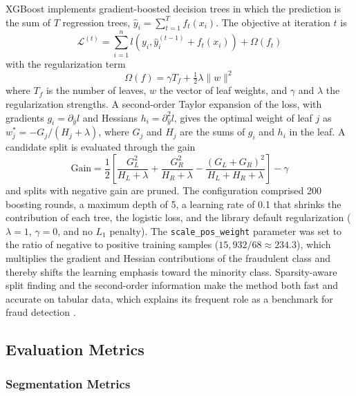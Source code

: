 \documentclass[conference]{IEEEtran}
\begin{document}
XGBoost \cite{chen2016xgboost} implements gradient-boosted decision trees in which the prediction is the sum of $T$ regression trees, $\hat{y}_i=\sum_{t=1}^{T}f_t(x_i)$. The objective at iteration $t$ is
\begin{equation}
    \mathcal{L}^{(t)} = \sum_{i=1}^{n} l(y_i, \hat{y}_i^{(t-1)} + f_t(x_i)) + \Omega(f_t)
\end{equation}
with the regularization term
\begin{equation}
    \Omega(f)=\gamma T_f + \tfrac{1}{2}\lambda\|w\|^2
\end{equation}
where $T_f$ is the number of leaves, $w$ the vector of leaf weights, and $\gamma$ and $\lambda$ the regularization strengths. A second-order Taylor expansion of the loss, with gradients $g_i=\partial_{\hat{y}}l$ and Hessians $h_i=\partial^2_{\hat{y}}l$, gives the optimal weight of leaf $j$ as $w_j^{*}=-G_j/(H_j+\lambda)$, where $G_j$ and $H_j$ are the sums of $g_i$ and $h_i$ in the leaf. A candidate split is evaluated through the gain
\begin{equation}
    \mathrm{Gain}=\frac{1}{2}\left[\frac{G_L^2}{H_L+\lambda}+\frac{G_R^2}{H_R+\lambda}-\frac{(G_L+G_R)^2}{H_L+H_R+\lambda}\right]-\gamma
\end{equation}
and splits with negative gain are pruned. The configuration comprised 200 boosting rounds, a maximum depth of 5, a learning rate of 0.1 that shrinks the contribution of each tree, the logistic loss, and the library default regularization ($\lambda=1$, $\gamma=0$, and no $L_1$ penalty). The \texttt{scale\_pos\_weight} parameter was set to the ratio of negative to positive training samples ($15{,}932/68\approx 234.3$), which multiplies the gradient and Hessian contributions of the fraudulent class and thereby shifts the learning emphasis toward the minority class. Sparsity-aware split finding and the second-order information make the method both fast and accurate on tabular data, which explains its frequent role as a benchmark for fraud detection \cite{sadgali2019performance,trivedi2020study,carcillo2018beyond}.

\subsection{Evaluation Metrics}

\subsubsection{Segmentation Metrics}
\end{document}
